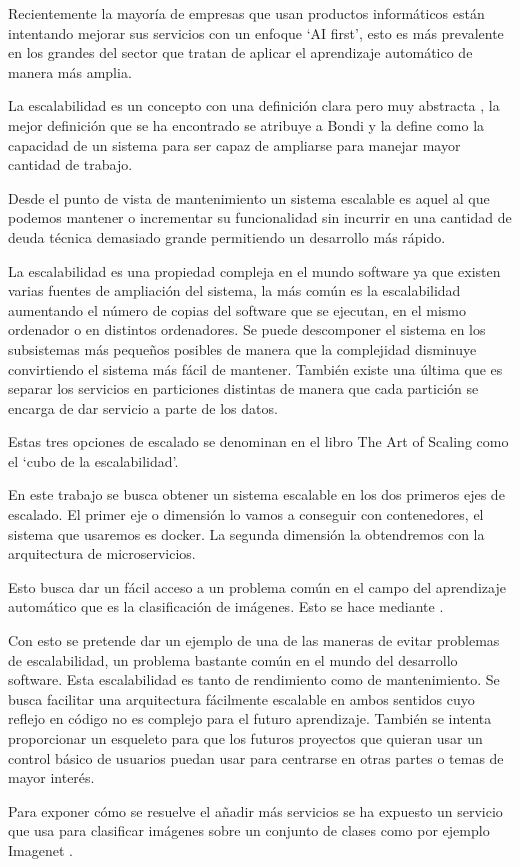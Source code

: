 Recientemente la mayoría de empresas que usan productos informáticos están intentando mejorar sus servicios con un enfoque `AI first', esto es más prevalente en los grandes del sector que  tratan de aplicar el aprendizaje automático de manera más amplia.

La escalabilidad es un concepto con una definición clara pero muy abstracta \cite{hill90}, la mejor definición que se ha encontrado se atribuye a Bondi \cite{bondi00} y la define como la capacidad de un sistema para ser capaz de ampliarse para manejar mayor cantidad de trabajo. 

Desde el punto de vista de mantenimiento un sistema escalable es aquel al que podemos mantener o incrementar su funcionalidad sin incurrir en una cantidad de deuda técnica demasiado grande permitiendo un desarrollo más rápido.

La escalabilidad es una propiedad compleja en el mundo software ya que existen varias fuentes de ampliación del sistema, la más común es la escalabilidad aumentando el número de copias del software que se ejecutan, en el mismo ordenador o en distintos ordenadores. Se puede descomponer el sistema en los subsistemas más pequeños posibles de manera que la complejidad disminuye convirtiendo el sistema más fácil de mantener. También existe una última que es separar los servicios en particiones distintas de manera que cada partición se encarga de dar servicio a parte de los datos.

Estas tres opciones de escalado se denominan en el libro The Art of Scaling \cite{scala09} como el `cubo de la escalabilidad'. 

En este trabajo se busca obtener un sistema escalable en los dos primeros ejes de escalado. El primer eje o dimensión lo vamos a conseguir con contenedores, el sistema que usaremos es docker. La segunda dimensión la obtendremos con la arquitectura de microservicios. 

Esto busca dar un fácil acceso a un problema común en el campo del aprendizaje automático que es la clasificación de imágenes. Esto se hace mediante .

Con esto se pretende dar un ejemplo de una de las  maneras de evitar problemas de escalabilidad, un problema bastante común en el mundo del desarrollo software. Esta escalabilidad es tanto de rendimiento como de mantenimiento. Se busca facilitar una arquitectura fácilmente escalable en ambos sentidos cuyo reflejo en código no es complejo para el futuro aprendizaje. También se intenta proporcionar un esqueleto para que los futuros proyectos que quieran usar un control básico de usuarios puedan usar para centrarse en otras partes o temas de mayor interés.

Para exponer cómo se resuelve el añadir más servicios se ha expuesto un servicio que usa  para clasificar imágenes sobre un conjunto de clases como por ejemplo Imagenet \cite{imnet}.